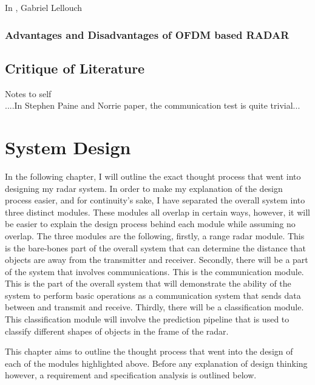 \documentclass[11pt]{report}
\begin{document}
In \cite{lellouch_waveform_2015}, Gabriel Lellouch




\subsection{Advantages and Disadvantages of OFDM based RADAR}




\section{Critique of Literature}
Notes to self \\
....In Stephen Paine and Norrie paper, the communication test is quite trivial...







\chapter{System Design}\label{ch:systemdesign}
In the following chapter, I will outline the exact thought process that went into designing my radar system. In order to make my explanation of the design process easier, and for continuity's sake, I have separated the overall system into three distinct modules. These modules all overlap in certain ways, however, it will be easier to explain the design process behind each module while assuming no overlap. The three modules are the following, firstly, a range radar module. This is the bare-bones part of the overall system that can determine the distance that objects are away from the transmitter and receiver. Secondly, there will be a part of the system that involves communications. This is the communication module. This is the part of the overall system that will demonstrate the ability of the system to perform basic operations as a communication system that sends data between and transmit and receive. Thirdly, there will be a classification module. This classification module will involve the prediction pipeline that is used to classify different shapes of objects in the frame of the radar. 

This chapter aims to outline the thought process that went into the design of each of the modules highlighted above. Before any explanation of design thinking however, a requirement and specification analysis is outlined below.
\end{document}
